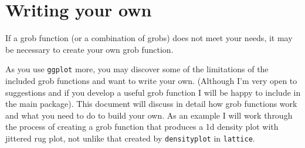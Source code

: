 

\section{Writing your own}\label{sec:writing_your_own}

If a grob function (or a combination of grobs) does not meet your needs, it may be necessary to create your own grob function.  

As you use \texttt{ggplot} more, you may discover some of the limitations of the included grob functions and want to write your own.  (Although I'm very open to suggestions and if you develop a useful grob function I will be happy to include in the main package).  This document will discuss in detail how grob functions work and what you need to do to build your own.  As an example I will work through the process of creating a grob function that produces a 1d density plot with jittered rug plot, not unlike that created by \texttt{densityplot} in \texttt{lattice}.

